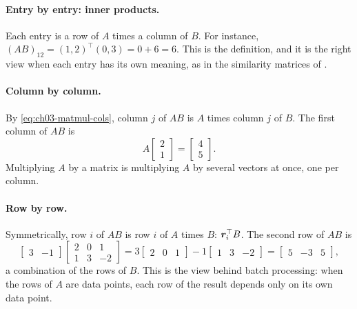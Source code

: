 \paragraph{Entry by entry: inner products.}
Each entry is a row of $A$ times a column of $B$. For instance,
$(AB)_{12} = (1, 2)^\top (0, 3) = 0 + 6 = 6$. This is the definition, and
it is the right view when each entry has its own meaning, as in the
similarity matrices of .

\paragraph{Column by column.}
By \cref{eq:ch03-matmul-cols}, column $j$ of $AB$ is $A$ times column $j$
of $B$. The first column of $AB$ is
\[
  A \begin{bmatrix} 2 \\ 1 \end{bmatrix} = \begin{bmatrix} 4 \\ 5
  \end{bmatrix}.
\]
Multiplying $A$ by a matrix is multiplying $A$ by several vectors at once,
one per column.

\paragraph{Row by row.}
Symmetrically, row $i$ of $AB$ is row $i$ of $A$ times $B$:
$\bm{r}_i^\top B$. The second row of $AB$ is
\[
  \begin{bmatrix} 3 & -1 \end{bmatrix}
  \begin{bmatrix} 2 & 0 & 1 \\ 1 & 3 & -2 \end{bmatrix}
  = 3 \begin{bmatrix} 2 & 0 & 1 \end{bmatrix}
    - 1 \begin{bmatrix} 1 & 3 & -2 \end{bmatrix}
  = \begin{bmatrix} 5 & -3 & 5 \end{bmatrix},
\]
a combination of the rows of $B$. This is the view behind batch
processing: when the rows of $A$ are data points, each row of the result
depends only on its own data point.

